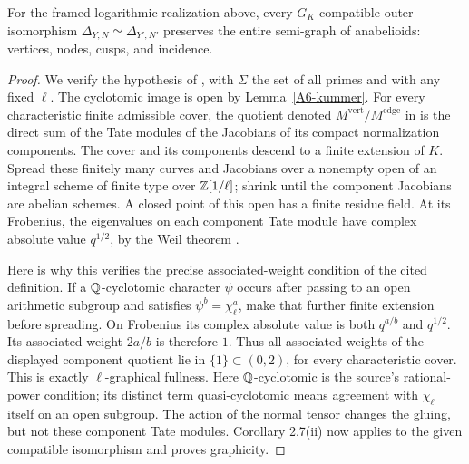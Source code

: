 \begin{lemma}\label{A6-graphic}
For the framed logarithmic realization above, every $G_K$-compatible outer isomorphism
$\Delta_{Y,N}\simeq\Delta_{Y',N'}$ preserves the entire semi-graph of anabelioids: vertices, nodes, cusps, and incidence.
\end{lemma}
\begin{proof}
We verify the hypothesis of \cite[Corollary 2.7(ii)]{Mochizuki2007A567}, with $\Sigma$ the set of all primes and with any fixed $\ell$. The cyclotomic image is open by Lemma~\ref{A6-kummer}. For every characteristic finite admissible cover, the quotient denoted
$M^{\mathrm{vert}}/M^{\mathrm{edge}}$ in \cite[Definition 2.3(iii)]{Mochizuki2007A567} is the direct sum of the Tate modules of the Jacobians of its compact normalization components. The cover and its components descend to a finite extension of $K$. Spread these finitely many curves and Jacobians over a nonempty open of an integral scheme of finite type over ${\mathbb{Z}}[1/\ell]$; shrink until the component Jacobians are abelian schemes. A closed point of this open has a finite residue field. At its Frobenius, the eigenvalues on each component Tate module have complex absolute value $q^{1/2}$, by the Weil theorem \cite[II, Theorem 1.1(b)]{MilneAVA567}.

Here is why this verifies the precise associated-weight condition of the cited definition. If a ${\mathbb{Q}}$-cyclotomic character $\psi$ occurs after passing to an open arithmetic subgroup and satisfies $\psi^b=\chi_\ell^a$, make that further finite extension before spreading. On Frobenius its complex absolute value is both $q^{a/b}$ and $q^{1/2}$. Its associated weight $2a/b$ is therefore $1$. Thus all associated weights of the displayed component quotient lie in $\{1\}\subset(0,2)$, for every characteristic cover. This is exactly $\ell$-graphical fullness. Here ${\mathbb{Q}}$-cyclotomic is the source's rational-power condition; its distinct term quasi-cyclotomic means agreement with $\chi_\ell$ itself on an open subgroup. The action of the normal tensor changes the gluing, but not these component Tate modules. Corollary 2.7(ii) now applies to the given compatible isomorphism and proves graphicity.
\end{proof}

